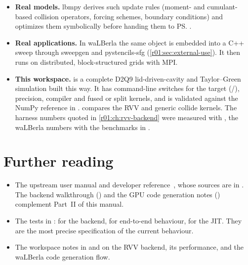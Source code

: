 \begin{itemize}
  \item \textbf{Real models.} lbmpy derives such update rules (moment- and
        cumulant-based collision operators, forcing schemes, boundary conditions) and
        optimizes them symbolically before handing them to \ps.
  \item \textbf{Real applications.} In waLBerla the same  object is
        embedded into a C++ sweep through sweepgen and pystencils-sfg
        (\cref{r01:sec:external-use}). It then runs on distributed, block-structured grids
        with MPI.
  \item \textbf{This workspace.}  is a
        complete D2Q9 lid-driven-cavity and Taylor--Green simulation built this way.
        It has command-line switches for the target (/),
        precision, compiler and fused or split kernels, and is validated against the
        NumPy reference in .
         compares the RVV and generic collide kernels.
        The harness numbers quoted in \cref{r01:ch:rvv-backend} were measured with
        , the waLBerla numbers with the
        benchmarks in .
\end{itemize}

\section{Further reading}
\begin{itemize}
  \item The upstream user manual and developer reference~\cite{pystencils-docs}, whose
        sources are in . The backend walkthrough
        () and the GPU code generation notes
        () complement Part~II of this manual.
  \item The tests in :  for the
        backend,  for end-to-end behaviour,  for the
        JIT. They are the most precise specification of the current behaviour.
  \item The workspace notes in  and  on the RVV
        backend, its performance, and the waLBerla code generation flow.
\end{itemize}
